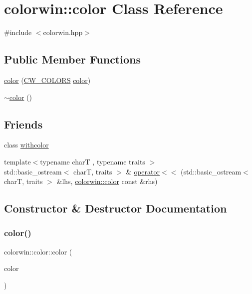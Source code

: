 \hypertarget{classcolorwin_1_1color}{}\section{colorwin\+:\+:color Class Reference}
\label{classcolorwin_1_1color}


{\ttfamily \#include $<$colorwin.\+hpp$>$}

\subsection*{Public Member Functions}
\begin{DoxyCompactItemize}
\item 
\hyperlink{classcolorwin_1_1color_a9eafc52a9a961ecf5448f925297089bc}{color} (\hyperlink{namespacecolorwin_a9c26d66eac71ba049d125e59a63e95d4}{C\+W\+\_\+\+C\+O\+L\+O\+RS} \hyperlink{classcolorwin_1_1color}{color})
\item 
\hyperlink{classcolorwin_1_1color_aae17b4c7bf1c06bb5045a4eedc6c8301}{$\sim$color} ()
\end{DoxyCompactItemize}
\subsection*{Friends}
\begin{DoxyCompactItemize}
\item 
class \hyperlink{classcolorwin_1_1color_ad638d9b6be1ba8bc574a7a58a748d2ca}{withcolor}
\item 
{\footnotesize template$<$typename charT , typename traits $>$ }\\std\+::basic\+\_\+ostream$<$ charT, traits $>$ \& \hyperlink{classcolorwin_1_1color_a91f8fd76f0843aa66acc62b67a105fc7}{operator$<$$<$} (std\+::basic\+\_\+ostream$<$ charT, traits $>$ \&lhs, \hyperlink{classcolorwin_1_1color}{colorwin\+::color} const \&rhs)
\end{DoxyCompactItemize}


\subsection{Constructor \& Destructor Documentation}
\mbox{\label{classcolorwin_1_1color_a9eafc52a9a961ecf5448f925297089bc}} 
\subsubsection{\texorpdfstring{color()}{color()}}
{\footnotesize\ttfamily colorwin\+::color\+::color (\begin{DoxyParamCaption}\item[{\hyperlink{namespacecolorwin_a9c26d66eac71ba049d125e59a63e95d4}{C\+W\+\_\+\+C\+O\+L\+O\+RS}}]{color }\end{DoxyParamCaption})\hspace{0.3cm}{\ttfamily [inline]}}


